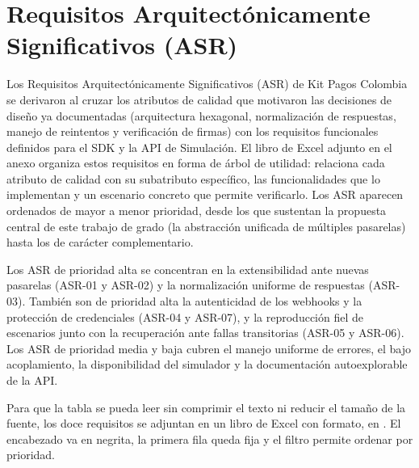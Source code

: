 \section{Requisitos Arquitectónicamente Significativos (ASR)}
Los Requisitos Arquitectónicamente Significativos (ASR) de Kit Pagos Colombia se derivaron al cruzar los atributos de calidad que motivaron las decisiones de diseño ya documentadas (arquitectura hexagonal, normalización de respuestas, manejo de reintentos y verificación de firmas) con los requisitos funcionales definidos para el SDK y la API de Simulación. El libro de Excel adjunto en el anexo organiza estos requisitos en forma de árbol de utilidad: relaciona cada atributo de calidad con su subatributo específico, las funcionalidades que lo implementan y un escenario concreto que permite verificarlo. Los ASR aparecen ordenados de mayor a menor prioridad, desde los que sustentan la propuesta central de este trabajo de grado (la abstracción unificada de múltiples pasarelas) hasta los de carácter complementario.

Los ASR de prioridad alta se concentran en la extensibilidad ante nuevas pasarelas (ASR-01 y ASR-02) y la normalización uniforme de respuestas (ASR-03). También son de prioridad alta la autenticidad de los webhooks y la protección de credenciales (ASR-04 y ASR-07), y la reproducción fiel de escenarios junto con la recuperación ante fallas transitorias (ASR-05 y ASR-06). Los ASR de prioridad media y baja cubren el manejo uniforme de errores, el bajo acoplamiento, la disponibilidad del simulador y la documentación autoexplorable de la API.

Para que la tabla se pueda leer sin comprimir el texto ni reducir el tamaño de la fuente, los doce requisitos se adjuntan en un libro de Excel con formato, en . El encabezado va en negrita, la primera fila queda fija y el filtro permite ordenar por prioridad.

